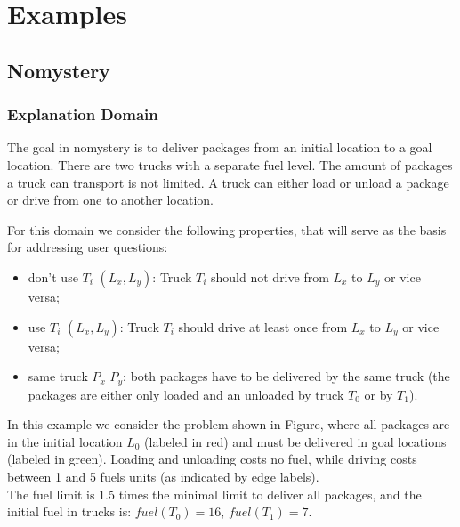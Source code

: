 \section{Examples}

\subsection{Nomystery}

\subsubsection*{Explanation Domain}
The goal in nomystery is to deliver packages from an initial location 
to a goal location. There are two trucks with a separate fuel level.
The amount of packages a truck can transport is not limited. A truck can either load or 
unload a package or drive from one to another location. 

For this domain we consider the following properties, that will serve as the basis for addressing user questions:

\begin{itemize}
	\item don't use $T_i$ $(L_x,L_y)$: Truck $T_i$ should not drive from $L_x$ to
		$L_y$ or vice versa;
	\item use $T_i$ $(L_x,L_y)$: Truck $T_i$ should drive at least once from $L_x$ to
		$L_y$ or vice versa;
	\item same truck $P_x$ $P_y$: both packages have to be delivered by the same truck
		(the packages are either only loaded and an unloaded by truck $T_0$ or by $T_1$).
\end{itemize}

In this example we consider the problem shown in Figure, where all packages are in the initial location $L_0$ (labeled in red) and must be delivered in goal locations (labeled in green). 
Loading and unloading costs no fuel, while driving costs between 1 and 5 fuels units (as indicated by edge labels).\\
The fuel limit is 1.5 times the minimal limit to deliver all packages, and the initial fuel in trucks is:	$fuel(T_0) = 16$, $fuel(T_1) = 7$.


